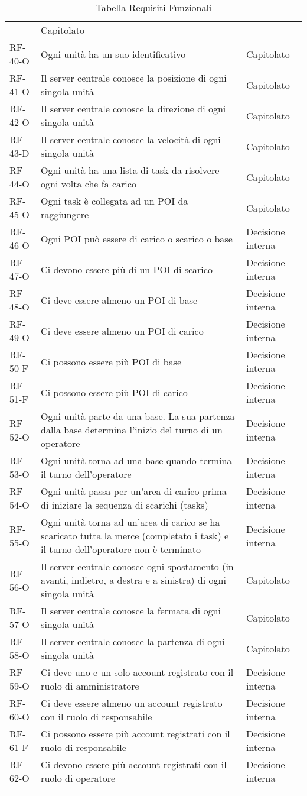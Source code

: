\begin{longtable}{ 
		>{}p{} 
		>{}p{}
		>{\centering}p{} }
&
Capitolato
\tabularnewline
RF-40-O
&
Ogni unità ha un suo identificativo
&
Capitolato
\tabularnewline
RF-41-O
&
Il server centrale conosce la posizione di ogni singola unità
&
Capitolato
\tabularnewline
RF-42-O
&
Il server centrale conosce la direzione di ogni singola unità
&
Capitolato
\tabularnewline
RF-43-D
&
Il server centrale conosce la velocità di ogni singola unità
&
Capitolato
\tabularnewline
RF-44-O
&
Ogni unità ha una lista di task da risolvere ogni volta che fa carico
&
Capitolato
\tabularnewline
RF-45-O
&
Ogni task è collegata ad un POI da raggiungere
&
Capitolato
\tabularnewline
RF-46-O
&
Ogni POI può essere di carico o scarico o base
&
Decisione interna
\tabularnewline
RF-47-O
&
Ci devono essere più di un POI di scarico
&
Decisione interna
\tabularnewline
RF-48-O
&
Ci deve essere almeno un POI di base
&
Decisione interna
\tabularnewline
RF-49-O
&
Ci deve essere almeno un POI di carico
&
Decisione interna
\tabularnewline
RF-50-F
&
Ci possono essere più POI di base
&
Decisione interna
\tabularnewline
RF-51-F
&
Ci possono essere più POI di carico
&
Decisione interna
\tabularnewline
RF-52-O
&
Ogni unità parte da una base. La sua partenza dalla base determina l'inizio del turno di un operatore
&
Decisione interna
\tabularnewline
RF-53-O
&
Ogni unità torna ad una base quando termina il turno dell’operatore
&
Decisione interna
\tabularnewline
RF-54-O
&
Ogni unità passa per un’area di carico prima di iniziare la sequenza di scarichi (tasks)
&
Decisione interna
\tabularnewline
RF-55-O
&
Ogni unità torna ad un'area di carico se ha scaricato tutta la merce (completato i task) e il turno dell’operatore non è terminato
&
Decisione interna
\tabularnewline
RF-56-O
&
Il server centrale conosce ogni spostamento (in avanti, indietro, a destra e a sinistra) di ogni singola unità
&
Capitolato
\tabularnewline
RF-57-O
&
Il server centrale conosce la fermata di ogni singola unità
&
Capitolato
\tabularnewline
RF-58-O
&
Il server centrale conosce la partenza di ogni singola unità
&
Capitolato
\tabularnewline
RF-59-O
&
Ci deve uno e un solo account registrato con il ruolo di amministratore
&
Decisione interna
\tabularnewline
RF-60-O
&
Ci deve essere almeno un account registrato con il ruolo di responsabile
&
Decisione interna
\tabularnewline
RF-61-F
&
Ci possono essere più account registrati con il ruolo di responsabile
&
Decisione interna
\tabularnewline
RF-62-O
&
Ci devono essere più account registrati con il ruolo di operatore
&
Decisione interna
\tabularnewline

\caption{Tabella Requisiti Funzionali\label{ Tabella Requisiti Funzionali}}
\end{longtable}
